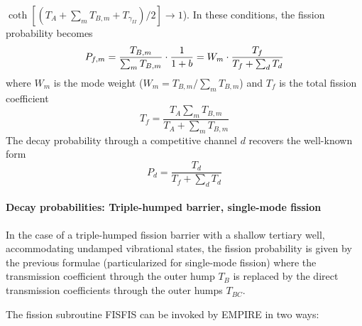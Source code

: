 $%
\coth[(T_{A}+\sum_{m}T_{B,m}+T_{\gamma_{II}})/2]\rightarrow1$). In these
conditions, the fission probability becomes
\begin{equation}
P_{f,m}=\frac{T_{B,m}}{\sum_{m}T_{B,m}}\cdot\frac{1}{1+b}=W_{m}\cdot\frac{%
T_{f}}{T_{f}+\sum_{d}T_{d}}  \label{wm}
\end{equation}
\noindent where $W_{m}$ is the mode weight ($W_{m}=T_{B,m}/\sum_{m}T_{B,m}$)
and $T_{f}$ is the total fission coefficient
\begin{equation}
T_{f}=\frac{T_{A}\sum_{m}T_{B,m}}{T_{A}+\sum_{m}T_{B,m}}
\end{equation}
The decay probability through a competitive channel $d$ recovers the
well-known form
\begin{equation}
P_{d}=\frac{T_{d}}{T_{f}+\sum_{d}T_{d}}
\end{equation}

\paragraph{Decay probabilities: Triple-humped barrier, single-mode fission}

In the case of a triple-humped fission barrier with a shallow tertiary well,
accommodating undamped vibrational states, the fission probability is given
by the previous formulae (particularized for single-mode fission) where the
transmission coefficient through the outer hump $T_{B}$ is replaced by the
direct transmission coefficients through the outer humps $T_{BC}$.

The fission subroutine FISFIS can be invoked by EMPIRE in two ways:

